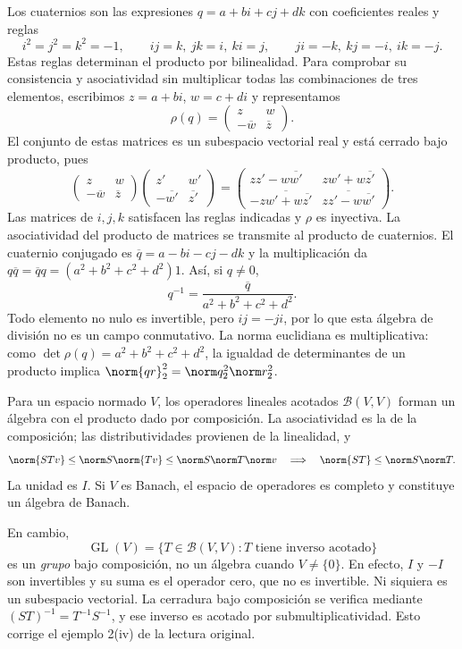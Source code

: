 \begin{ejemplo}
Los cuaternios son las expresiones $q=a+bi+cj+dk$ con coeficientes reales y reglas
\[
 i^2=j^2=k^2=-1,\qquad ij=k,\ jk=i,\ ki=j,
 \qquad ji=-k,\ kj=-i,\ ik=-j.
\]
Estas reglas determinan el producto por bilinealidad. Para comprobar su consistencia y asociatividad sin multiplicar todas las combinaciones de tres elementos, escribimos $z=a+bi$, $w=c+di$ y representamos
\[
 \rho(q)=\begin{pmatrix}z&w\\-\overline w&\overline z\end{pmatrix}.
\]
El conjunto de estas matrices es un subespacio vectorial real y está cerrado bajo producto, pues
\[
 \begin{pmatrix}z&w\\-\overline w&\overline z\end{pmatrix}
 \begin{pmatrix}z'&w'\\-\overline {w'}&\overline {z'}\end{pmatrix}
 =\begin{pmatrix}
 zz'-w\overline {w'}&zw'+w\overline {z'}\\
 -\overline{zw'+w\overline {z'}}&\overline{zz'-w\overline {w'}}
 \end{pmatrix}.
\]
Las matrices de $i,j,k$ satisfacen las reglas indicadas y $\rho$ es inyectiva. La asociatividad del producto de matrices se transmite al producto de cuaternios. El cuaternio conjugado es $\overline q=a-bi-cj-dk$ y la multiplicación da
$q\overline q=\overline q q=(a^2+b^2+c^2+d^2)1$. Así, si $q\ne0$,
\[
 q^{-1}=\frac{\overline q}{a^2+b^2+c^2+d^2}.
\]
Todo elemento no nulo es invertible, pero $ij=-ji$, por lo que esta álgebra de división no es un campo conmutativo. La norma euclidiana es multiplicativa: como $\det\rho(q)=a^2+b^2+c^2+d^2$, la igualdad de determinantes de un producto implica $\norm{qr}_2^2=\norm q_2^2\norm r_2^2$.
\end{ejemplo}

\begin{ejemplo}
Para un espacio normado $V$, los operadores lineales acotados $\mathcal B(V,V)$ forman un álgebra con el producto dado por composición. La asociatividad es la de la composición; las distributividades provienen de la linealidad, y
\[
 \norm{STv}\le\norm S\norm{Tv}\le\norm S\norm T\norm v
 \quad\Longrightarrow\quad\norm{ST}\le\norm S\norm T.
\]
La unidad es $I$. Si $V$ es Banach, el espacio de operadores es completo y constituye un álgebra de Banach.

En cambio,
\[
 \operatorname{GL}(V)=\{T\in\mathcal B(V,V):T\text{ tiene inverso acotado}\}
\]
es un \emph{grupo} bajo composición, no un álgebra cuando $V\ne\{0\}$. En efecto, $I$ y $-I$ son invertibles y su suma es el operador cero, que no es invertible. Ni siquiera es un subespacio vectorial. La cerradura bajo composición se verifica mediante $(ST)^{-1}=T^{-1}S^{-1}$, y ese inverso es acotado por submultiplicatividad. Esto corrige el ejemplo 2(iv) de la lectura original.
\end{ejemplo}

